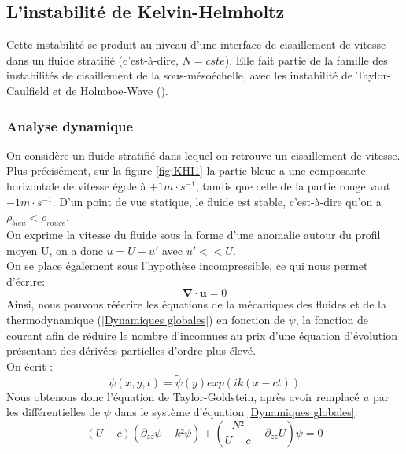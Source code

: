 \documentclass{rapportECC}
\begin{document}
\subsection{L'instabilité de Kelvin-Helmholtz}
\label{KHI}

Cette instabilité se produit au niveau d'une interface de cisaillement de vitesse dans un fluide stratifié (c'est-à-dire, $N = cste$). Elle fait partie de la famille des instabilités de cisaillement de la sous-mésoéchelle, avec les instabilité de Taylor-Caulfield et de Holmboe-Wave (\cite{shear_instabilities_2018}).
\\

\subsubsection{Analyse dynamique}

On considère un fluide stratifié dans lequel on retrouve un cisaillement de vitesse. Plus précisément, sur la figure \ref{fig:KHI1} la partie bleue a une composante horizontale de vitesse égale à $+1 m \cdot s^{-1}$, tandis que celle de la partie rouge vaut $-1 m \cdot s^{-1}$. D'un point de vue statique, le fluide est stable, c'est-à-dire qu'on a $\rho_{bleu} < \rho_{rouge}$. \\
On exprime la vitesse du fluide sous la forme d'une anomalie autour du profil moyen U, on a donc $u = U+u'$ avec $u'<<U$. \\
On se place également sous l'hypothèse incompressible, ce qui nous permet d'écrire: 
\begin{equation}
    \mathbf{\nabla} \cdot \mathbf{u} = 0
\end{equation}
Ainsi, nous pouvons réécrire les équations de la mécaniques des fluides et de la thermodynamique (\ref{Dynamiques globales}) en fonction de $\psi$, la fonction de courant afin de réduire le nombre d'inconnues au prix d'une équation d'évolution présentant des dérivées partielles d'ordre plus élevé.
\\
On écrit :
\begin{equation}
    \psi(x,y,t) = \tilde{\psi}(y)exp(ik(x-ct))
    \label{eq: fct courant}
\end{equation}
Nous obtenons donc l'équation de Taylor-Goldstein, après avoir remplacé $u$ par les différentielles de $\psi$ dans le système d'équation \ref{Dynamiques globales}: \\
\begin{equation}
    (U - c)( \partial_{zz}\tilde{\psi} - k²\tilde{\psi}) + (\frac{N²}{U - c} - \partial_{zz} U)\tilde{\psi} = 0
    \label{eq: taylor goldstein}
\end{equation}
\end{document}
